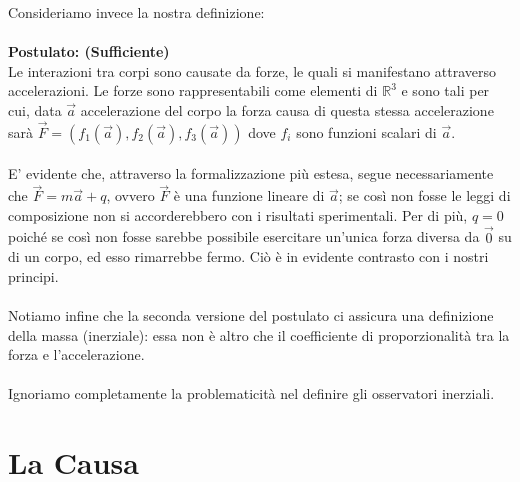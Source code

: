 \documentclass[]{article}
\begin{document}
	Consideriamo invece la nostra definizione:\\\\
	\textbf{Postulato: (Sufficiente)}\\
	Le interazioni tra corpi sono causate da forze, le quali si manifestano attraverso accelerazioni. Le forze sono rappresentabili come elementi di $\mathbb{R}^3$ e sono tali per cui, data $\vec{a}$ accelerazione del corpo la forza causa di questa stessa accelerazione sarà $\vec{F}=(f_1(\vec{a}),f_2(\vec{a}),f_3(\vec{a}))$ dove $f_i$ sono funzioni scalari di $\vec{a}$.
	\\\\
	E' evidente che, attraverso la formalizzazione più estesa, segue necessariamente che $\vec{F}=m\vec{a}+q$, ovvero $\vec{F}$ è una funzione lineare di $\vec{a}$; se così non fosse le leggi di composizione non si accorderebbero con i risultati sperimentali. Per di più, $q=0$ poiché se così non fosse sarebbe possibile esercitare un'unica forza diversa da $\vec{0}$ su di un corpo, ed esso rimarrebbe fermo. Ciò è in evidente contrasto con i nostri principi.\\
	\\
    Notiamo infine che la seconda versione del postulato ci assicura una definizione della massa (inerziale): essa non è altro che il coefficiente di proporzionalità tra la forza e l'accelerazione.
 \\\\
	Ignoriamo completamente la problematicità nel definire gli osservatori inerziali. 
	\section{La Causa}
 
\end{document}
